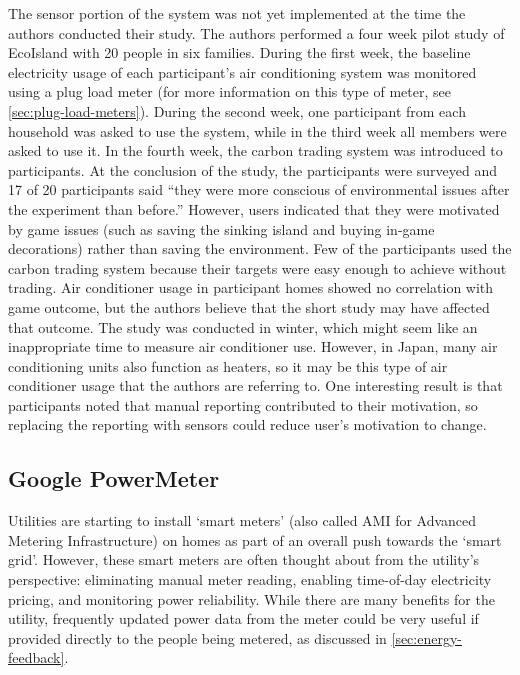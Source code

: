The sensor portion of the system was not yet implemented at the time the authors conducted their study. The authors performed a four week pilot study of EcoIsland with 20 people in six families. During the first week, the baseline electricity usage of each participant's air conditioning system was monitored using a plug load meter (for more information on this type of meter, see \autoref{sec:plug-load-meters}). During the second week, one participant from each household was asked to use the system, while in the third week all members were asked to use it. In the fourth week, the carbon trading system was introduced to participants. At the conclusion of the study, the participants were surveyed and 17 of 20 participants said ``they were more conscious of environmental issues after the experiment than before.'' However, users indicated that they were motivated by game issues (such as saving the sinking island and buying in-game decorations) rather than saving the environment. Few of the participants used the carbon trading system because their targets were easy enough to achieve without trading. Air conditioner usage in participant homes showed no correlation with game outcome, but the authors believe that the short study may have affected that outcome. The study was conducted in winter, which might seem like an inappropriate time to measure air conditioner use. However, in Japan, many air conditioning units also function as heaters, so it may be this type of air conditioner usage that the authors are referring to. One interesting result is that participants noted that manual reporting contributed to their motivation, so replacing the reporting with sensors could reduce user's motivation to change.

\subsection{Google PowerMeter}
\label{sec:google-powermeter}

Utilities are starting to install `smart meters' (also called AMI for Advanced Metering Infrastructure) on homes as part of an overall push towards the `smart grid'. However, these smart meters are often thought about from the utility's perspective: eliminating manual meter reading, enabling time-of-day electricity pricing, and monitoring power reliability. While there are many benefits for the utility, frequently updated power data from the meter could be very useful if provided directly to the people being metered, as discussed in \autoref{sec:energy-feedback}.

